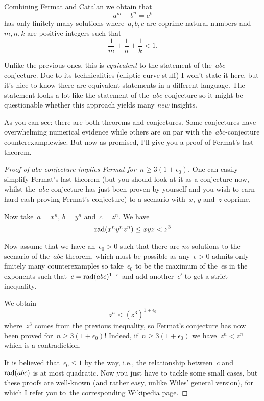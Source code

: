 \begin{description}
    Combining Fermat and Catalan we obtain that
    \begin{equation}
      a^m+b^n=c^k
    \end{equation}
    has only finitely many solutions where~$a,b,c$ are coprime natural numbers and~$m,n,k$ are positive integers such that
    \begin{equation}
      \frac{1}{m}+\frac{1}{n}+\frac{1}{k}<1.
    \end{equation}

  \item[\textbf{Szpiro's conjecture}] Unlike the previous ones, this is \emph{equivalent} to the statement of the~$abc$-conjecture. Due to its technicalities (elliptic curve stuff) I won't state it here, but it's nice to know there are equivalent statements in a different language. The statement looks a lot like the statement of the~$abc$\nobreakdash-conjecture so it might be questionable whether this approach yields many \emph{new} insights.
\end{description}

As you can see: there are both theorems and conjectures. Some conjectures have overwhelming numerical evidence while others are on par with the~$abc$-conjecture counterexamplewise. But now as promised, I'll give you a proof of Fermat's last theorem.


\begin{proof}[Proof of $abc$-conjecture implies Fermat for~$n\geq3(1+\epsilon_0)$]
  One can easily simplify Fermat's last theorem (but you should look at it as a conjecture now, whilst the~$abc$\nobreakdash-con\-jecture has just been proven by yourself and you wish to earn hard cash proving Fermat's conjecture) to a scenario with~$x$, $y$ and~$z$ coprime.
  
  Now take~$a=x^n$, $b=y^n$ and~$c=z^n$. We have
  \begin{equation}
    \operatorname{rad}(x^ny^nz^n)\leq xyz<z^3
  \end{equation}

  Now assume that we have an~$\epsilon_0>0$ such that there are \emph{no} solutions to the scenario of the~$abc$\nobreakdash-theorem, which must be possible as any~$\epsilon>0$ admits only finitely many counterexamples so take~$\epsilon_0$ to be the maximum of the~$\epsilon$s in the exponents such that~$c=\operatorname{rad}(abc)^{1+\epsilon}$ and add another~$\epsilon'$ to get a strict inequality.
  
  We obtain
  \begin{equation}
    z^n<(z^3)^{1+\epsilon_0}
  \end{equation}
  where~$z^3$ comes from the previous inequality, so Fermat's conjecture has now been proved for~$n\geq 3(1+\epsilon_0)$! Indeed, if~$n\geq 3(1+\epsilon_0)$ we have~$z^n<z^n$ which is a contradiction.

  It is believed that~$\epsilon_0\leq 1$ by the way, i.e., the relationship between~$c$ and~$\operatorname{rad}(abc)$ is at most quadratic. Now you just have to tackle some small cases, but these proofs are well-known (and rather easy, unlike Wiles' general version), for which I refer you to~\href{http://en.wikipedia.org/wiki/Fermat's\_Last\_Theorem#Proofs\_for\_specific\_exponents}{the corresponding Wikipedia page}.
\end{proof}
